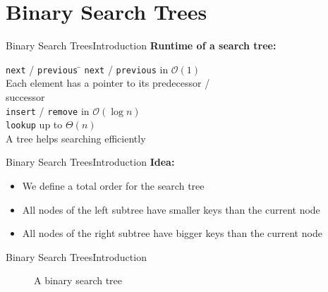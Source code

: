 \section{Binary Search Trees}

\begin{frame}{Binary Search Trees}{Introduction}
  \textbf{Runtime of a search tree:}
  \begin{tabbing}
    {\color{Mittel-Blau}\texttt{next}} /
    {\color{Mittel-Blau}\texttt{previous}} \=\kill
    {\color{Mittel-Blau}\texttt{next}} /
    {\color{Mittel-Blau}\texttt{previous}}\>
    in $\mathcal{O}(1)$\\
    \hspace{1.5em}Each element has a pointer to its predecessor /\\
    \hspace{1.5em}successor\\[0.5em]
    {\color{Mittel-Blau}\texttt{insert}} /
    {\color{Mittel-Blau}\texttt{remove}} \>
    in $\mathcal{O}(\log n)$\\[0.5em]
    {\color{Mittel-Blau}\texttt{lookup}} \>
    up to $\Theta(n)$\\
    \hspace{1.5em}A tree helps searching efficiently\\[0.5em]
  \end{tabbing}
\end{frame}


\begin{frame}{Binary Search Trees}{Introduction}
  \textbf{Idea:}
  \begin{itemize}
    \item
      We define a total order for the search tree
    \item
      All nodes of the left subtree have {\color{Mittel-Blau}smaller keys}
      than the current node
    \item
      All nodes of the right subtree have {\color{Mittel-Blau}bigger keys}
      than the current node
  \end{itemize}
\end{frame}


\begin{frame}{Binary Search Trees}{Introduction}
  \begin{figure}
    
    \caption{A binary search tree}
    \label{fig:binary_search_trees:binary_tree_example1}
  \end{figure}
\end{frame}

